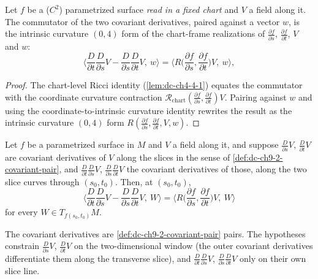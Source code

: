 \begin{lemma}
  \label{lem:dc-ch9-2-8-curvature-substitution}


  Let $f$ be a ($C^2$) parametrized surface \emph{read in a fixed chart} and $V$ a field along
  it. The commutator of the two covariant derivatives, paired against a vector $w$, is the
  intrinsic curvature $(0,4)$ form of the chart-frame realizations of $\frac{\partial f}{\partial s}$,
  $\frac{\partial f}{\partial t}$, $V$ and $w$:
  $$
  \Big\langle\frac{D}{\partial t}\frac{D}{\partial s}V - \frac{D}{\partial s}\frac{D}{\partial t}V,\ w\Big\rangle
    = \Big\langle R\Big(\frac{\partial f}{\partial s},\frac{\partial f}{\partial t}\Big)V,\ w\Big\rangle,
  $$
\end{lemma}
\begin{proof}

  \sketch
  The chart-level Ricci identity (\cref{lem:dc-ch4-4-1}) equates the commutator with the
  coordinate curvature contraction $\mathcal{R}_{\mathrm{chart}}(\frac{\partial f}{\partial s},\frac{\partial f}{\partial t})V$.
  Pairing against $w$ and using the coordinate-to-intrinsic curvature identity rewrites
  the result as the intrinsic curvature $(0,4)$ form
  $R(\frac{\partial f}{\partial s},\frac{\partial f}{\partial t},V,w)$.
\end{proof}
\begin{lemma}
  \label{lem:dc-ch9-2-8-curvature-substitution-manifold}


  Let $f$ be a parametrized surface in $M$ and $V$ a field along it, and suppose
  $\frac{D}{\partial s}V$, $\frac{D}{\partial t}V$ are covariant derivatives of $V$ along the
  slices in the sense of \cref{def:dc-ch9-2-covariant-pair}, and
  $\frac{D}{\partial t}\frac{D}{\partial s}V$, $\frac{D}{\partial s}\frac{D}{\partial t}V$ the
  covariant derivatives of those, along the two slice curves through $(s_0,t_0)$. Then, at
  $(s_0,t_0)$,
  $$
  \Big\langle\frac{D}{\partial t}\frac{D}{\partial s}V - \frac{D}{\partial s}\frac{D}{\partial t}V,\ W\Big\rangle
    = \Big\langle R\Big(\frac{\partial f}{\partial s},\frac{\partial f}{\partial t}\Big)V,\ W\Big\rangle
  $$
  for every $W\in T_{f(s_0,t_0)}M$.

  The covariant derivatives are \cref{def:dc-ch9-2-covariant-pair} pairs. The hypotheses
  constrain $\frac{D}{\partial s}V$, $\frac{D}{\partial t}V$ on the two-dimensional window
  (the outer covariant derivatives differentiate them along the transverse slice), and
  $\frac{D}{\partial t}\frac{D}{\partial s}V$, $\frac{D}{\partial s}\frac{D}{\partial t}V$ only
  on their own slice line.
\end{lemma}
